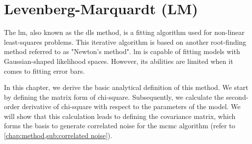 \documentclass[12pt, TexShade, letterpaper]{report}
\begin{document}
\section{Levenberg-Marquardt (LM)}
\label{chap:method,sub:LM}
The \gls{lm}, also known as the \gls{dls} method, is a fitting algorithm used for non-linear least-squares problems. This iterative algorithm is based on another root-finding method referred to as "Newton's method". \gls{lm} is capable of fitting models with Gaussian-shaped likelihood spaces. However, its abilities are limited when it comes to fitting error bars.\par
In this chapter, we derive the basic analytical definition of this method. We start by defining the matrix form of chi-square. Subsequently, we calculate the second-order derivative of chi-square with respect to the parameters of the model. We will show that this calculation leads to defining the covariance matrix, which forms the basis to generate correlated noise for the \gls{mcmc} algorithm (refer to \ref{chap:method,sub:correlated noise}).\par
\end{document}
